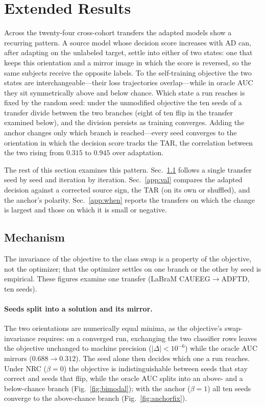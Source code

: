 \documentclass[letterpaper]{article} %
\begin{document}
\section{Extended Results}\label{app:results}
Across the twenty-four cross-cohort transfers the adapted models show a recurring pattern. A source
model whose decision score increases with AD can, after adapting on the unlabeled target, settle
into either of two states: one that keeps this orientation and a mirror image in which the score is
reversed, so the same subjects receive the opposite labels. To the self-training objective the two
states are interchangeable---their loss trajectories overlap---while in oracle AUC they sit
symmetrically above and below chance. Which state a run reaches is fixed by the random seed: under
the unmodified objective the ten seeds of a transfer divide between the two branches (eight of ten
flip in the transfer examined below), and the division persists as training converges. Adding the
anchor changes only which branch is reached---every seed converges to the orientation in which the
decision score tracks the TAR, the correlation between the two rising from $0.315$ to $0.945$ over
adaptation.

The rest of this section examines this pattern. Sec.~\ref{app:mech} follows a single transfer seed
by seed and iteration by iteration. Sec.~\ref{app:val} compares the adapted decision against a
corrected source sign, the TAR (on its own or shuffled), and the anchor's polarity.
Sec.~\ref{app:when} reports the transfers on which the change is largest and those on which it is
small or negative.

\subsection{Mechanism}\label{app:mech}
The invariance of the objective to the class swap is a property of the objective, not the optimizer; that the optimizer settles on one branch or the other by seed is empirical. These figures examine one transfer (LaBraM CAUEEG$\to$ADFTD, ten seeds).

\paragraph{Seeds split into a solution and its mirror.} The two orientations are numerically equal
minima, as the objective's swap-invariance requires: on a converged run, exchanging the two classifier rows leaves
the objective unchanged to machine precision ($|\Delta|<10^{-6}$) while the oracle AUC mirrors
($0.688\to0.312$). The seed alone then decides which one a run reaches. Under NRC ($\beta{=}0$) the
objective is indistinguishable between seeds that stay correct and seeds that flip, while the oracle
AUC splits into an above- and a below-chance branch (Fig.~\ref{fig:bimodal}); with the anchor
($\beta{=}1$) all ten seeds converge to the above-chance branch (Fig.~\ref{fig:anchorfix}).
\end{document}
